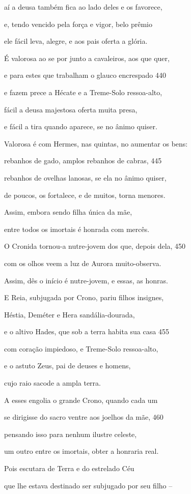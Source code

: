 aí a deusa também fica ao lado deles e os favorece,

e, tendo vencido pela força e vigor, belo prêmio

ele fácil leva, alegre, e aos pais oferta a glória.

É valorosa ao se por junto a cavaleiros, aos que quer,

e para estes que trabalham o glauco encrespado \num{440}

e fazem prece a Hécate e a Treme-Solo ressoa-alto,

fácil a deusa majestosa oferta muita presa,

e fácil a tira quando aparece, se no ânimo quiser.

Valorosa é com Hermes, nas quintas, no aumentar os bens:

rebanhos de gado, amplos rebanhos de cabras, \num{445}

rebanhos de ovelhas lanosas, se ela no ânimo quiser,

de poucos, os fortalece, e de muitos, torna menores.

Assim, embora sendo filha única da mãe,

entre todos os imortais é honrada com mercês.

O Cronida tornou-a nutre-jovem dos que, depois dela, \num{450}

com os olhos veem a luz de Aurora muito-observa.

Assim, dês o início é nutre-jovem, e essas, as honras.

\medskip

E Reia, subjugada por Crono, pariu filhos insignes,

Héstia, Deméter e Hera sandália-dourada,

e o altivo Hades, que sob a terra habita sua casa \num{455}

com coração impiedoso, e Treme-Solo ressoa-alto,

e o astuto Zeus, pai de deuses e homens,

cujo raio sacode a ampla terra.

A esses engolia o grande Crono, quando cada um

se dirigisse do sacro ventre aos joelhos da mãe, \num{460}

pensando isso para nenhum ilustre celeste,

um outro entre os imortais, obter a honraria real.

Pois escutara de Terra e do estrelado Céu

que lhe estava destinado ser subjugado por seu filho --

